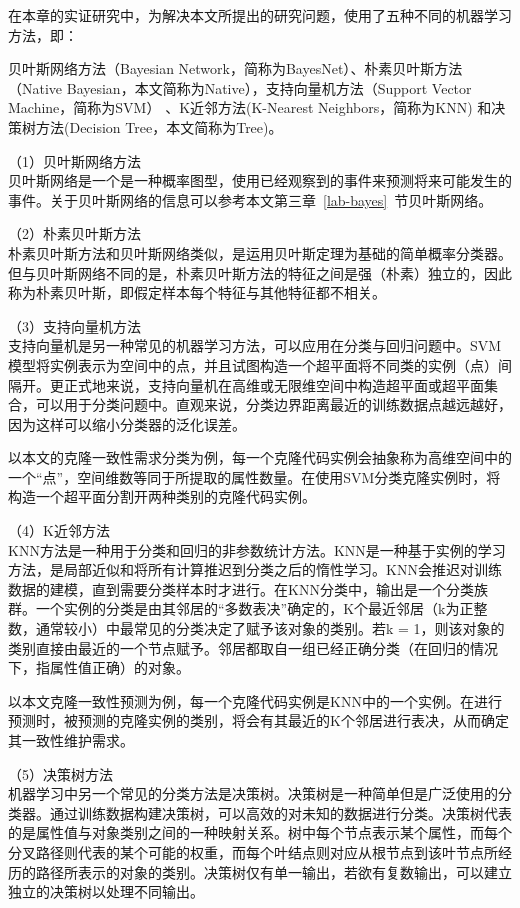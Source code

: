 在本章的实证研究中，为解决本文所提出的研究问题，使用了五种不同的机器学习方法，即：{贝叶斯网络方法（Bayesian Network，简称为BayesNet）\cite{friedman1997bayesian}、朴素贝叶斯方法（Native Bayesian，本文简称为Native）\cite{john1995estimating}，支持向量机方法（Support Vector Machine，简称为SVM）\cite{platt199912} 、K近邻方法(K-Nearest Neighbors，简称为KNN) \cite{aha1991instance}和决策树方法(Decision Tree，本文简称为Tree)\cite{quinlan2014c4}。

（1）贝叶斯网络方法\\
贝叶斯网络是一个是一种概率图型，使用已经观察到的事件来预测将来可能发生的事件\cite{friedman1997bayesian}。关于贝叶斯网络的信息可以参考本文第三章~\ref{lab-bayes}~节贝叶斯网络。

（2）朴素贝叶斯方法\\
朴素贝叶斯方法和贝叶斯网络类似，是运用贝叶斯定理为基础的简单概率分类器。但与贝叶斯网络不同的是，朴素贝叶斯方法的特征之间是强（朴素）独立的，因此称为朴素贝叶斯，即假定样本每个特征与其他特征都不相关。 

（3）支持向量机方法\\
支持向量机是另一种常见的机器学习方法，可以应用在分类与回归问题中。SVM模型将实例表示为空间中的点，并且试图构造一个超平面将不同类的实例（点）间隔开。更正式地来说，支持向量机在高维或无限维空间中构造超平面或超平面集合，可以用于分类问题中。直观来说，分类边界距离最近的训练数据点越远越好，因为这样可以缩小分类器的泛化误差。

以本文的克隆一致性需求分类为例，每一个克隆代码实例会抽象称为高维空间中的一个“点”，空间维数等同于所提取的属性数量。在使用SVM分类克隆实例时，将构造一个超平面分割开两种类别的克隆代码实例。

（4）K近邻方法\\
KNN方法是一种用于分类和回归的非参数统计方法。KNN是一种基于实例的学习方法，是局部近似和将所有计算推迟到分类之后的惰性学习。KNN会推迟对训练数据的建模，直到需要分类样本时才进行。在KNN分类中，输出是一个分类族群。一个实例的分类是由其邻居的“多数表决”确定的，K个最近邻居（k为正整数，通常较小）中最常见的分类决定了赋予该对象的类别。若k = 1，则该对象的类别直接由最近的一个节点赋予。邻居都取自一组已经正确分类（在回归的情况下，指属性值正确）的对象。

以本文克隆一致性预测为例，每一个克隆代码实例是KNN中的一个实例。在进行预测时，被预测的克隆实例的类别，将会有其最近的K个邻居进行表决，从而确定其一致性维护需求。

（5）决策树方法\\
机器学习中另一个常见的分类方法是决策树。决策树是一种简单但是广泛使用的分类器。通过训练数据构建决策树，可以高效的对未知的数据进行分类。决策树代表的是属性值与对象类别之间的一种映射关系。树中每个节点表示某个属性，而每个分叉路径则代表的某个可能的权重，而每个叶结点则对应从根节点到该叶节点所经历的路径所表示的对象的类别。决策树仅有单一输出，若欲有复数输出，可以建立独立的决策树以处理不同输出。

}
